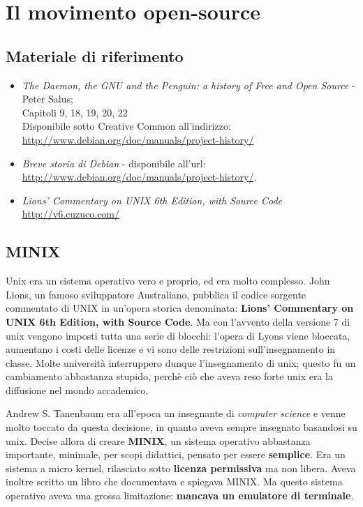 \section{Il movimento open-source}

\subsection{Materiale di riferimento}

\begin{itemize}

\item \textit{The Daemon, the GNU and the Penguin: a history of Free and Open Source} - Peter Salus;\\
Capitoli 9, 18, 19, 20, 22 \\
Disponibile sotto Creative Common all'indirizzo: \\
\url{http://www.debian.org/doc/manuals/project-history/}
\item \textit{Breve storia di Debian} - disponibile all'url:\\
 \url{http://www.debian.org/doc/manuals/project-history/}.
\item \textit{Lions' Commentary on UNIX 6th Edition, with Source Code}\\ \url{http://v6.cuzuco.com/}

\end{itemize}

\subsection{MINIX}

Unix era un sistema operativo vero e proprio, ed era molto complesso. John Lions, un famoso sviluppatore Australiano, pubblica il codice sorgente commentato di UNIX in un'opera storica denominata: \textbf{Lions' Commentary on UNIX 6th Edition, with Source Code}. Ma con l'avvento della versione 7 di unix vengono imposti tutta una serie di blocchi: l'opera di Lyons viene bloccata, aumentano i costi delle licenze e vi sono delle restrizioni sull'insegnamento in classe. Molte università interruppero dunque l'insegnamento di unix; questo fu un cambiamento abbastanza stupido, perchè ciò che aveva reso forte unix era la diffusione nel mondo accademico. 

Andrew S. Tanenbaum era all'epoca un insegnante di \textit{computer science} e venne molto toccato da questa decisione, in quanto aveva sempre insegnato basandosi su unix. Decise allora di creare \textbf{MINIX}, un sistema operativo abbastanza importante, minimale, per scopi didattici, pensato per essere \textbf{semplice}. Era un sistema a micro kernel, rilasciato sotto \textbf{licenza permissiva} ma non libera. Aveva inoltre scritto un libro che documentava e spiegava MINIX. Ma questo sistema operativo aveva una grossa limitazione: \textbf{mancava un emulatore di terminale}.

